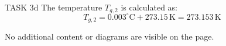 TASK 3d  
The temperature \( T_{g,2} \) is calculated as:  
\[
T_{g,2} = 0.003^\circ\text{C} + 273.15 \, \text{K} = 273.153 \, \text{K}
\]  

No additional content or diagrams are visible on the page.